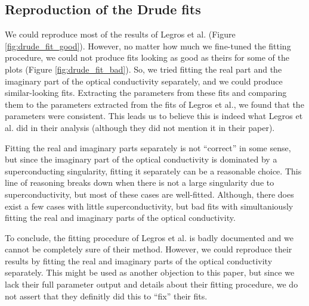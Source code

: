 \subsection{Reproduction of the Drude fits}
We could reproduce most of the results of Legros et al. (Figure \ref{fig:drude_fit_good}).
However, no matter how much we fine-tuned the fitting procedure, we could not produce fits looking
as good as theirs for some of the plots (Figure \ref{fig:drude_fit_bad}). So, we tried fitting the
real part and the imaginary part of the optical conductivity separately, and we could produce
similar-looking fits. Extracting the parameters from these fits and comparing them to the parameters
extracted from the fits of Legros et al., we found that the parameters were consistent. This leads
us to believe this is indeed what Legros et al. did in their analysis (although they did not mention
it in their paper).

Fitting the real and imaginary parts separately is not ``correct'' in some sense, but since the
imaginary part of the optical conductivity is dominated by a superconducting singularity, fitting
it separately can be a reasonable choice. This line of reasoning breaks down when there is not a
large singularity due to superconductivity, but most of these cases are well-fitted. Although, there
does exist a few cases with little superconductivity, but bad fits with simultaniously fitting the real
and imaginary parts of the optical conductivity.

To conclude, the fitting procedure of Legros et al. is badly documented and we cannot be completely
sure of their method. However, we could reproduce their results by fitting the real and imaginary
parts of the optical conductivity separately. This might be used as another objection to this paper,
but since we lack their full parameter output and details about their fitting procedure, we do not
assert that they definitly did this to ``fix'' their fits.

